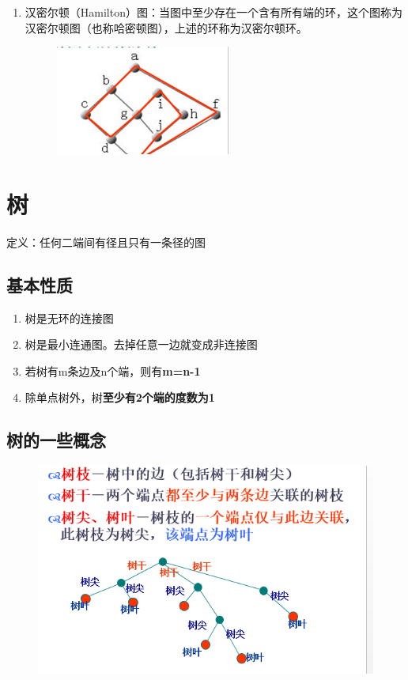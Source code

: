 \begin{enumerate}
	\item 汉密尔顿（Hamilton）图：当图中至少存在一个含有所有端的环，这个图称为汉密尔顿图（也称哈密顿图），上述的环称为汉密尔顿环。
	\begin{figure}[H]
		\centering
		\includegraphics[width=0.7\linewidth]{figures/screenshot052}
		\caption{}
		\label{fig:screenshot052}
	\end{figure}
	
\end{enumerate}

\section{树}
定义：任何二端间有径且只有一条径的图
\subsection{基本性质}
\begin{enumerate}
	\item 树是无环的连接图
	\item 树是最小连通图。去掉任意一边就变成非连接图
	\item 若树有m条边及n个端，则有\textbf{m=n-1}
	\item 除单点树外，树\textbf{至少有2个端的度数为1}
\end{enumerate}
\subsection{树的一些概念}
\begin{figure}[H]
	\centering
	\includegraphics[width=0.7\linewidth]{figures/screenshot053}
	\caption{}
	\label{fig:screenshot053}
\end{figure}

